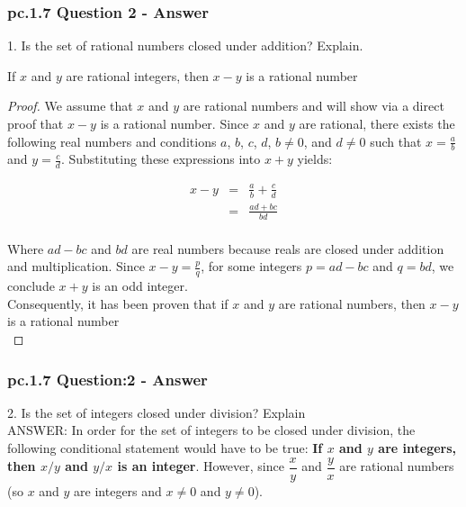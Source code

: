 \subsubsection*{pc.1.7 Question 2 - Answer}

1. Is the set of rational numbers closed under addition? Explain. \\

\begin{tcolorbox}
\begin{theorem}
If $x$ and $y$ are rational integers, then $x - y$ is a rational number
\end{theorem}
\end{tcolorbox}

\begin{proof}
We assume that $x$ and $y$ are rational numbers and will show via a direct proof that $x - y$ is a rational number. Since $x$ and $y$ are rational, there exists the following real numbers and conditions $a$, $b$, $c$, $d$,  $b \neq 0$, and $d \neq 0$ such that $x = \frac{a}{b}$ and $y = \frac{c}{d}$. Substituting these expressions into $x + y$ yields:

\begin{eqnarray*}
x - y & = & \frac{a}{b} + \frac{c}{d} \nonumber \\
& = & \frac{ad + bc}{bd} \nonumber \\
\end{eqnarray*}

Where $ad - bc$ and $bd$ are real numbers because reals are closed under addition and multiplication. Since $x - y = \frac{p}{q}$, for some integers $p = ad - bc$ and $q = bd$, we conclude $x + y$ is an odd integer. \\
Consequently, it has been proven that if $x$ and $y$ are rational numbers, then $x - y$ is a rational number \\
\end{proof}


\subsubsection*{pc.1.7 Question:2 - Answer}
2. Is the set of integers closed under division? Explain \\

ANSWER: In order for the set of integers to be closed under division, the following conditional statement would have to be true: {\bf If $x$ and $y$ are integers, then $x/y$ and $y/x$ is an integer}. However, since $\dfrac{x}{y}$ and $\dfrac{y}{x}$ are rational numbers (so $x$ and $y$ are integers and  $x \neq 0$ and $y \neq 0$). \\

